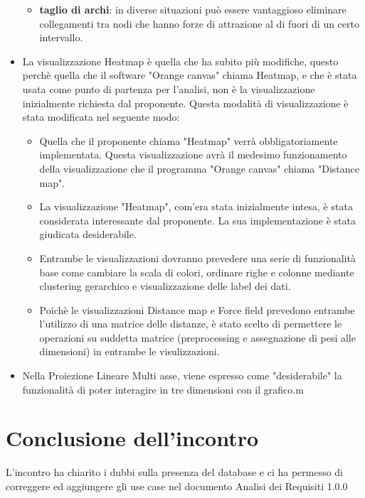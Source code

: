 \documentclass{article}
\begin{document}
\begin{itemize}
\begin {itemize}
			\item \textbf{taglio di archi}: in diverse situazioni può essere vantaggioso eliminare collegamenti tra nodi che hanno forze di attrazione al di fuori di un certo intervallo.
		\end {itemize}
		\item La visualizzazione Heatmap è quella che ha subito più modifiche, questo perchè quella che il software "Orange canvas" chiama Heatmap, e che è stata usata come punto di partenza per l'analisi, non è la visualizzazione inizialmente richiesta dal proponente. Questa modalità di visualizzazione è stata modificata nel seguente modo:
		\begin {itemize}
			\item Quella che il proponente chiama "Heatmap" verrà obbligatoriamente implementata. Questa visualizzazione avrà il medesimo funzionamento della visualizzazione che il programma "Orange canvas" chiama "Distance map".
			\item La visualizzazione "Heatmap", com'era stata inizialmente intesa, è stata considerata interessante dal proponente. La sua implementazione è stata giudicata desiderabile.
			\item Entrambe le visualizzazioni dovranno prevedere una serie di funzionalità base come cambiare la scala di colori, ordinare righe e colonne mediante clustering gerarchico e visualizzazione delle label dei dati.
			\item Poichè le visualizzazioni Distance map e Force field prevedono entrambe l'utilizzo di una matrice delle distanze, è stato scelto di permettere le operazioni su suddetta matrice (preprocessing e assegnazione di pesi alle dimensioni) in entrambe le visulizzazioni.
		\end {itemize}
		\item Nella Proiezione Lineare Multi asse, viene espresso come "desiderabile" la funzionalità di poter interagire in tre dimensioni con il grafico.m
	  \end{itemize}

\section{Conclusione dell'incontro}
\label{sec:conclusione}
L'incontro ha chiarito i dubbi sulla presenza del database e ci ha permesso di correggere ed aggiungere gli use case nel documento Analisi dei Requisiti 1.0.0
\end{document}
